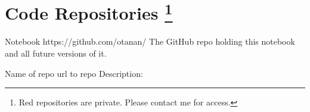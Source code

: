 \chapter*{Code Repositories%
    \footnote{Red repositories are private. Please contact me for access.}
}

\begin{privaterepo}{Notebook}
{https://github.com/otanan/}
    The GitHub repo holding this notebook and all future versions of it.  
\end{privaterepo}

\begin{repo}{Name of repo}
{url to repo}
    Description:
\end{repo}